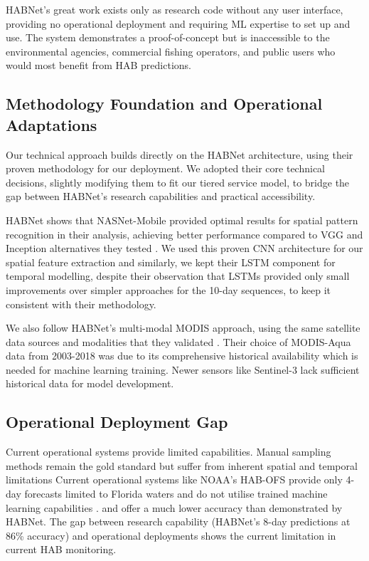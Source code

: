 \documentclass[conference]{IEEEtran}
\begin{document}
HABNet's great work exists only as research code without any user interface, providing no operational deployment and requiring ML expertise to set up and use. The system demonstrates a proof-of-concept but is inaccessible to the environmental agencies, commercial fishing operators, and public users who would most benefit from HAB predictions.

\subsection{Methodology Foundation and Operational Adaptations}

Our technical approach builds directly on the HABNet architecture, using their proven methodology for our deployment. We adopted their core technical decisions, slightly modifying them to fit our tiered service model, to bridge the gap between HABNet's research capabilities and practical accessibility.

HABNet shows that NASNet-Mobile provided optimal results for spatial pattern recognition in their analysis, achieving better performance compared to VGG and Inception alternatives they tested \cite{b1}. We used this proven CNN architecture for our spatial feature extraction and similarly, we kept their LSTM component for temporal modelling, despite their observation that LSTMs provided only small improvements over simpler approaches for the 10-day sequences, to keep it consistent with their methodology.

We also follow HABNet's multi-modal MODIS approach, using the same satellite data sources and modalities that they validated \cite{b1}. Their choice of MODIS-Aqua data from 2003-2018 was due to its comprehensive historical availability which is needed for machine learning training. Newer sensors like Sentinel-3 lack sufficient historical data for model development.

\subsection{Operational Deployment Gap}

Current operational systems provide limited capabilities. Manual sampling methods remain the gold standard but suffer from inherent spatial and temporal limitations \cite{b2} Current operational systems like NOAA's HAB-OFS \cite{b9} provide only 4-day forecasts limited to Florida waters and do not utilise trained machine learning capabilities \cite{b1}. and offer a much lower accuracy than demonstrated by HABNet. The gap between research capability (HABNet's 8-day predictions at 86\% accuracy) and operational deployments shows the current limitation in current HAB monitoring.
\end{document}
